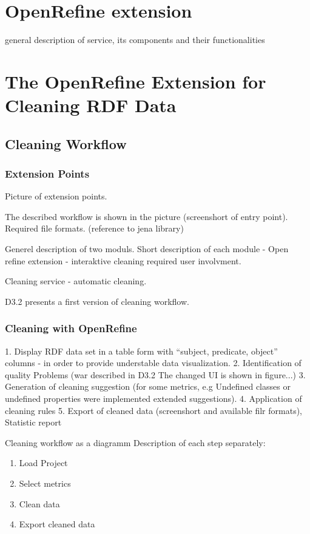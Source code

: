 \section{OpenRefine extension}


general description of service, its components and their functionalities


\section{The OpenRefine Extension for Cleaning RDF Data}
\label{sec:cleaning}

\subsection{Cleaning Workflow}

\subsubsection{Extension Points}

Picture of extension points.

The described workflow is shown in the picture (screenshort of entry point).
Required file formats. (reference to jena library)


Generel description of two moduls. 
Short description of each module - Open refine extension - interaktive cleaning required user involvment.

Cleaning service - automatic cleaning.


D3.2 presents a first version of cleaning workflow. 

\subsubsection{Cleaning with OpenRefine}

1. Display RDF data set in a table form with "`subject, predicate, object"' columns -  in order to provide understable data visualization.
2. Identification of quality Problems (war described in D3.2 The changed UI is shown in figure...)
3. Generation of cleaning suggestion (for some metrics, e.g Undefined classes or undefined properties were implemented extended suggestions).
4. Application of cleaning rules
5. Export of cleaned data (screenshort and available filr formats), Statistic report



Cleaning workflow as a diagramm
Description of each step separately:
\begin{enumerate}
	
\item Load Project
\item Select metrics
\item Clean data
 \item Export cleaned data
\end{enumerate}
